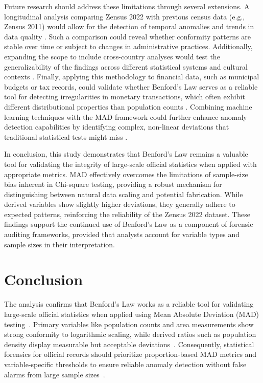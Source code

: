 \documentclass[11pt,a4paper]{article}
\begin{document}
Future research should address these limitations through several extensions. A longitudinal analysis comparing Zensus 2022 with previous census data (e.g., Zensus 2011) would allow for the detection of temporal anomalies and trends in data quality \cite{Druica2018BenfordsLA}. Such a comparison could reveal whether conformity patterns are stable over time or subject to changes in administrative practices. Additionally, expanding the scope to include cross-country analyses would test the generalizability of the findings across different statistical systems and cultural contexts \cite{Tosic2021UseOB}. Finally, applying this methodology to financial data, such as municipal budgets or tax records, could validate whether Benford's Law serves as a reliable tool for detecting irregularities in monetary transactions, which often exhibit different distributional properties than population counts \cite{Azevedo2021ABL}. Combining machine learning techniques with the MAD framework could further enhance anomaly detection capabilities by identifying complex, non-linear deviations that traditional statistical tests might miss \cite{Le2024BenfordsLA}.

In conclusion, this study demonstrates that Benford's Law remains a valuable tool for validating the integrity of large-scale official statistics when applied with appropriate metrics. MAD effectively overcomes the limitations of sample-size bias inherent in Chi-square testing, providing a robust mechanism for distinguishing between natural data scaling and potential fabrication. While derived variables show slightly higher deviations, they generally adhere to expected patterns, reinforcing the reliability of the Zensus 2022 dataset. These findings support the continued use of Benford's Law as a component of forensic auditing frameworks, provided that analysts account for variable types and sample sizes in their interpretation.

\section{Conclusion}
The analysis confirms that Benford's Law works as a reliable tool for validating large-scale official statistics when applied using Mean Absolute Deviation (MAD) testing~\cite{Kossovsky2021OnTM}. Primary variables like population counts and area measurements show strong conformity to logarithmic scaling, while derived ratios such as population density display measurable but acceptable deviations~\cite{Druica2018BenfordsLA}. Consequently, statistical forensics for official records should prioritize proportion-based MAD metrics and variable-specific thresholds to ensure reliable anomaly detection without false alarms from large sample sizes~\cite{Petras2025DetectingBL}.



\printbibliography
\end{document}
